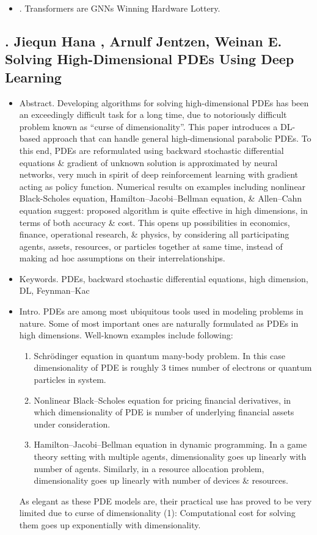\documentclass{article}
\begin{document}
\begin{itemize}
    
    \item {. Transformers are GNNs Winning Hardware Lottery.}
\end{itemize}


\subsection{\cite{Han_Jentzen_Weinan2018}. {\sc Jiequn Hana , Arnulf Jentzen, Weinan E}. Solving High-Dimensional PDEs Using Deep Learning}
{\sf[2102 citations]}
\begin{itemize}
	\item {\sf Abstract.} Developing algorithms for solving high-dimensional PDEs has been an exceedingly difficult task for a long time, due to notoriously difficult problem known as ``curse of dimensionality''. This paper introduces a DL-based approach that can handle general high-dimensional parabolic PDEs. To this end, PDEs are reformulated using backward stochastic differential equations \& gradient of unknown solution is approximated by neural networks, very much in spirit of deep reinforcement learning with gradient acting as policy function. Numerical results on examples including nonlinear Black-Scholes equation, Hamilton--Jacobi--Bellman equation, \& Allen--Cahn equation suggest: proposed algorithm is quite effective in high dimensions, in terms of both accuracy \& cost. This opens up possibilities in economics, finance, operational research, \& physics, by considering all participating agents, assets, resources, or particles together at same time, instead of making ad hoc assumptions on their interrelationships.
	\item {\sf Keywords.} PDEs, backward stochastic differential equations, high dimension, DL, Feynman--Kac
	\item {\sf Intro.} PDEs are among most ubiquitous tools used in modeling problems in nature. Some of most important ones are naturally formulated as PDEs in high dimensions. Well-known examples include following:
	\begin{enumerate}
		\item Schr\"odinger equation in quantum many-body problem. In this case dimensionality of PDE is roughly 3 times number of electrons or quantum particles in system.
		\item Nonlinear Black--Scholes equation for pricing financial derivatives, in which dimensionality of PDE is number of underlying financial assets under consideration.
		\item Hamilton--Jacobi--Bellman equation in dynamic programming. In a game theory setting with multiple agents, dimensionality goes up linearly with number of agents. Similarly, in a resource allocation problem, dimensionality goes up linearly with number of devices \& resources.
	\end{enumerate}
	As elegant as these PDE models are, their practical use has proved to be very limited due to curse of dimensionality (1): Computational cost for solving them goes up exponentially with dimensionality.
	

\end{itemize}
\end{document}
